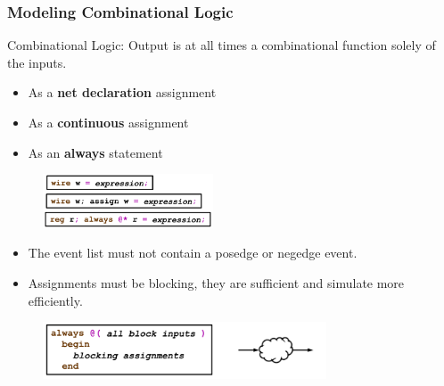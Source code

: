 \documentclass[t, notes, xcolor=table]{beamer}
\begin{document}
\begin{frame}
\frametitle{Modeling Combinational Logic}
Combinational Logic: Output is at all times a combinational function solely of the inputs.
\scriptsize{
\begin{multicols}{2}
\begin{itemize}
\item As a \textbf{net declaration} assignment
\item As a \textbf{continuous} assignment
\item As an \textbf{always} statement
\end{itemize}
\vfill
\columnbreak
\begin{figure}
    \includegraphics[width=0.45\textwidth]{img/13_seq_1.png}
\end{figure}
\end{multicols}
\begin{itemize}
\item The event list must not contain a posedge or negedge event.
\item Assignments must be blocking, they are sufficient and simulate more efficiently.
\end{itemize}
}
\begin{figure}
    \includegraphics[width=0.75\textwidth]{img/13_seq_2.png}
\end{figure}
\end{frame}
\end{document}
